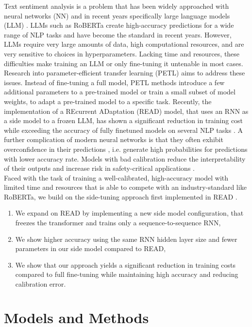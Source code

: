 \documentclass[10pt,conference,compsocconf]{IEEEtran}
\begin{document}
Text sentiment analysis is a problem that has been widely approached with neural networks (NN) and in recent years specifically large language models (LLM) \cite{roberta, nguyen2020bertweet, gpt3, devlin2018bert}. LLMs such as RoBERTa \cite{roberta} create high-accuracy predictions for a wide range of NLP tasks and have become the standard in recent years. However, LLMs require very large amounts of data, high computational resources, and are very sensitive to choices in hyperparameters. Lacking time and resources, these difficulties make training an LLM or only fine-tuning it untenable in most cases. Research into parameter-efficient transfer learning (PETL) aims to address these issues. Instead of fine-tuning a full model, PETL methods introduce a few additional parameters to a pre-trained model or train a small subset of model weights, to adapt a pre-trained model to a specific task. Recently, the implementation of a REcurrent ADaptation (READ) model, that uses an RNN as a side model to a frozen LLM, has shown a significant reduction in training cost while exceeding the accuracy of fully finetuned models on several NLP tasks \cite{read}. A further complication of modern neural networks is that they often exhibit overconfidence in their predictions \cite{guo2017calibration}, i.e. generate high probabilities for predictions with lower accuracy rate. Models with bad calibration reduce the interpretability of their outputs and increase risk in safety-critical applications \cite{vaicenavicius2019evaluating, guo2017calibration}. \\
Faced with the task of training a well-calibrated, high-accuracy model with limited time and resources that is able to compete with an industry-standard like RoBERTa, we build on the side-tuning approach first implemented in READ \cite{read}.
\begin{enumerate}
    \item We expand on READ by implementing a new side model configuration, that freezes the transformer and trains only a sequence-to-sequence RNN,
    \item We show higher accuracy using the same RNN hidden layer size and fewer parameters in our side model compared to READ,
    \item We show that our approach yields a significant reduction in training costs compared to full fine-tuning while maintaining high accuracy and reducing calibration error.
\end{enumerate}


\section{Models and Methods}
\label{sec:models-methods}
\end{document}
